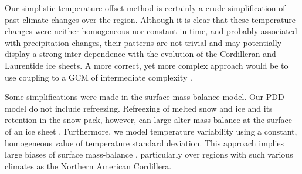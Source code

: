 Our simplistic temperature offset method is certainly a crude simplification of past climate changes over the region. Although it is clear that these temperature changes were neither homogeneous nor constant in time, and probably associated with precipitation changes, their patterns are not trivial and may potentially display a strong inter-dependence with the evolution of the Cordilleran and Laurentide ice sheets. A more correct, yet more complex approach would be to use coupling to a GCM of intermediate complexity \citep{yoshimori-etal-2001,calov-etal-2002,abeouchi-etal-2007,charbit-etal-2013}.

Some simplifications were made in the surface mass-balance model. Our PDD model do not include refreezing. Refreezing of melted snow and ice and its retention in the snow pack, however, can large alter mass-balance at the surface of an ice sheet \citep{janssens-huybrechts-2000}. Furthermore, we model temperature variability using a constant, homogeneous value of temperature standard deviation. This approach implies large biases of surface mass-balance \citep{charbit-etal-2013,rau-rogozhina-2013,seguinot-inreview}, particularly over regions with such various climates as the Northern American Cordillera.

